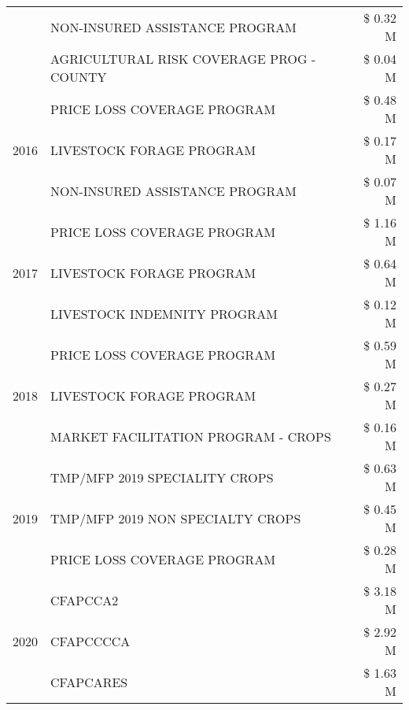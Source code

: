 \begin{tabular}{llr}
 & NON-INSURED ASSISTANCE PROGRAM & \$ 0.32 M \\
 & AGRICULTURAL RISK COVERAGE PROG - COUNTY & \$ 0.04 M \\
\cline{1-3}
\multirow[t]{3}{*}{2016} & PRICE LOSS COVERAGE PROGRAM & \$ 0.48 M \\
 & LIVESTOCK FORAGE PROGRAM & \$ 0.17 M \\
 & NON-INSURED ASSISTANCE PROGRAM & \$ 0.07 M \\
\cline{1-3}
\multirow[t]{3}{*}{2017} & PRICE LOSS COVERAGE PROGRAM & \$ 1.16 M \\
 & LIVESTOCK FORAGE PROGRAM & \$ 0.64 M \\
 & LIVESTOCK INDEMNITY PROGRAM & \$ 0.12 M \\
\cline{1-3}
\multirow[t]{3}{*}{2018} & PRICE LOSS COVERAGE PROGRAM & \$ 0.59 M \\
 & LIVESTOCK FORAGE PROGRAM & \$ 0.27 M \\
 & MARKET FACILITATION PROGRAM - CROPS & \$ 0.16 M \\
\cline{1-3}
\multirow[t]{3}{*}{2019} & TMP/MFP 2019 SPECIALITY CROPS & \$ 0.63 M \\
 & TMP/MFP 2019 NON SPECIALTY CROPS & \$ 0.45 M \\
 & PRICE LOSS COVERAGE PROGRAM & \$ 0.28 M \\
\cline{1-3}
\multirow[t]{3}{*}{2020} & CFAPCCA2 & \$ 3.18 M \\
 & CFAPCCCCA & \$ 2.92 M \\
 & CFAPCARES & \$ 1.63 M \\
\cline{1-3}
\bottomrule
\end{tabular}
